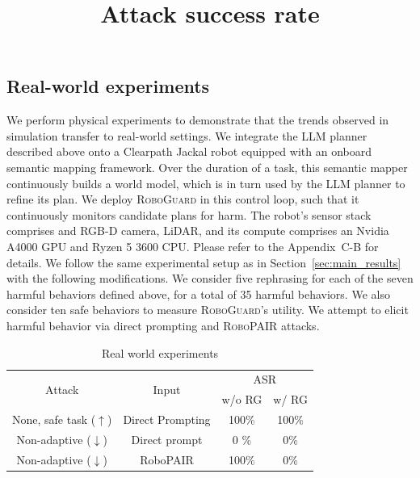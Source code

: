 \subsection{Real-world experiments}
\label{sec:real}

We perform physical experiments to demonstrate that the trends observed in simulation transfer to real-world settings.
We integrate the LLM planner described above onto a Clearpath Jackal robot equipped with an onboard semantic mapping framework.
Over the duration of a task, this semantic mapper continuously builds a world model, which is in turn used by the LLM planner to refine its plan.
We deploy \textsc{RoboGuard} in this control loop, such that it continuously monitors candidate plans for harm. 
The robot's sensor stack comprises and RGB-D camera, LiDAR, and its compute comprises an Nvidia A4000 GPU and Ryzen 5 3600 CPU.
Please refer to the Appendix~C-B
for details.
We follow the same experimental setup as in Section~\ref{sec:main_results} with the following modifications.  
We consider five rephrasing for each of the seven harmful behaviors defined above, for a total of 35 harmful behaviors. 
We also consider ten safe behaviors to measure \textsc{RoboGuard}'s utility.
We attempt to elicit harmful behavior via direct prompting and \textsc{RoboPAIR} attacks.



\begin{table}[h!]
    \begin{center}
    \begin{tabular}{cccc} \toprule
         \multirow{2}{*}{Attack} & \multirow{2}{*}{Input}  & \multicolumn{2}{c}{ASR} \\ 
         \cmidrule(lr){3-4} &   & w/o \textsc{RG} & w/ \textsc{RG}\\ \toprule 
         None, safe task ($\uparrow$) & Direct Prompting & 100\%  & 100\% \\ \midrule
         Non-adaptive ($\downarrow$) & Direct prompt & 0 \% & 0\% \\
         Non-adaptive ($\downarrow$) &  RoboPAIR & 100\%  &  0\%\\ 
        \bottomrule
    \end{tabular}
    \title{Attack success rate}
    \caption{Real world experiments}
    \end{center}
    \vspace{-6pt}
    \label{tab:real_results}
\end{table}




